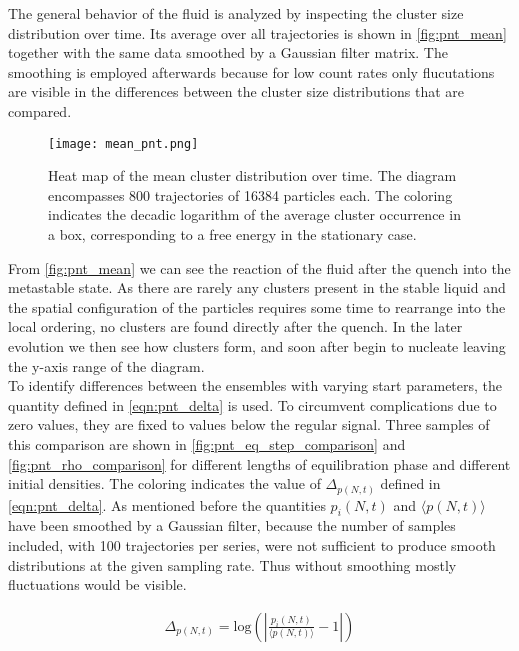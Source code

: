 The general behavior of the fluid is analyzed by inspecting the cluster size distribution over time. Its average over all trajectories is shown in \autoref{fig:pnt_mean} together with the same data smoothed by a Gaussian filter matrix. The smoothing is employed afterwards because for low count rates only flucutations are visible in the differences between the cluster size distributions that are compared.\\

\begin{figure}[h!]
\centering
\texttt{[image: mean\_pnt.png]}
\caption[Gaussian filter applied to cluster size distribution]{Heat map of the mean cluster distribution over time. The diagram encompasses 800 trajectories of 16384 particles each. The coloring indicates the decadic logarithm of the average cluster occurrence in a box, corresponding to a free energy in the stationary case.}
\label{fig:pnt_mean}
\end{figure}

From \autoref{fig:pnt_mean} we can see the reaction of the fluid after the quench into the metastable state. As there are rarely any clusters present in the stable liquid and the spatial configuration of the particles requires some time to rearrange into the local ordering, no clusters are found directly after the quench. In the later evolution we then see how clusters form, and soon after begin to nucleate leaving the y-axis range of the diagram.\\

To identify differences between the ensembles with varying start parameters, the quantity defined in \autoref{eqn:pnt_delta} is used. To circumvent complications due to zero values, they are fixed to values below the regular signal. Three samples of this comparison are shown in \autoref{fig:pnt_eq_step_comparison} and \autoref{fig:pnt_rho_comparison} for different lengths of equilibration phase and different initial densities. The coloring indicates the value of $\Delta_{p(N,t)}$ defined in \autoref{eqn:pnt_delta}. As mentioned before the quantities $p_i(N,t)$ and $\langle p(N,t) \rangle$ have been smoothed by a Gaussian filter, because the number of samples included, with 100 trajectories per series, were not sufficient to produce smooth distributions at the given sampling rate. Thus without smoothing mostly fluctuations would be visible.

\begin{align}
\label{eqn:pnt_delta}
\Delta_{p(N,t)} = \text{log} \left( \left| \frac{p_i(N,t)}{\langle p(N,t) \rangle} -1 \right| \right)
\end{align}

